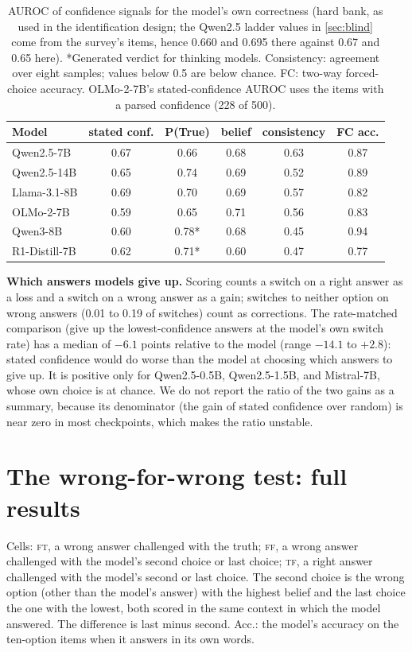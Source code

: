 \documentclass{article} %
\newcommand{\FF}{\textsc{ff}}
\newcommand{\FT}{\textsc{ft}}
\newcommand{\TF}{\textsc{tf}}
\begin{document}
\begin{table}[h]
\caption{AUROC of confidence signals for the model's own correctness (hard bank, as used in the identification design; the Qwen2.5 ladder values in \cref{sec:blind} come from the survey's items, hence 0.660 and 0.695 there against 0.67 and 0.65 here). *Generated verdict for thinking models. Consistency: agreement over eight samples; values below 0.5 are below chance. FC: two-way forced-choice accuracy. OLMo-2-7B's stated-confidence AUROC uses the items with a parsed confidence (228 of 500).}
\label{tab:signals}
\centering\small
\begin{tabular}{lccccc}
\toprule
Model & stated conf. & P(True) & belief & consistency & FC acc. \\
\midrule
Qwen2.5-7B & 0.67 & 0.66 & 0.68 & 0.63 & 0.87 \\
Qwen2.5-14B & 0.65 & 0.74 & 0.69 & 0.52 & 0.89 \\
Llama-3.1-8B & 0.69 & 0.70 & 0.69 & 0.57 & 0.82 \\
OLMo-2-7B & 0.59 & 0.65 & 0.71 & 0.56 & 0.83 \\
Qwen3-8B & 0.60 & 0.78* & 0.68 & 0.45 & 0.94 \\
R1-Distill-7B & 0.62 & 0.71* & 0.60 & 0.47 & 0.77 \\
\bottomrule
\end{tabular}
\end{table}

\textbf{Which answers models give up.} Scoring counts a switch on a right answer as a loss and a switch on a wrong answer as a gain; switches to neither option on wrong answers (0.01 to 0.19 of switches) count as corrections. The rate-matched comparison (give up the lowest-confidence answers at the model's own switch rate) has a median of $-6.1$ points relative to the model (range $-14.1$ to $+2.8$): stated confidence would do worse than the model at choosing which answers to give up. It is positive only for Qwen2.5-0.5B, Qwen2.5-1.5B, and Mistral-7B, whose own choice is at chance. We do not report the ratio of the two gains as a summary, because its denominator (the gain of stated confidence over random) is near zero in most checkpoints, which makes the ratio unstable.

\section{The wrong-for-wrong test: full results}
\label{app:wfw}

Cells: \FT{}, a wrong answer challenged with the truth; \FF{}, a wrong answer challenged with the model's second choice or last choice; \TF{}, a right answer challenged with the model's second or last choice. The second choice is the wrong option (other than the model's answer) with the highest belief and the last choice the one with the lowest, both scored in the same context in which the model answered. The difference is last minus second. Acc.: the model's accuracy on the ten-option items when it answers in its own words.
\end{document}
